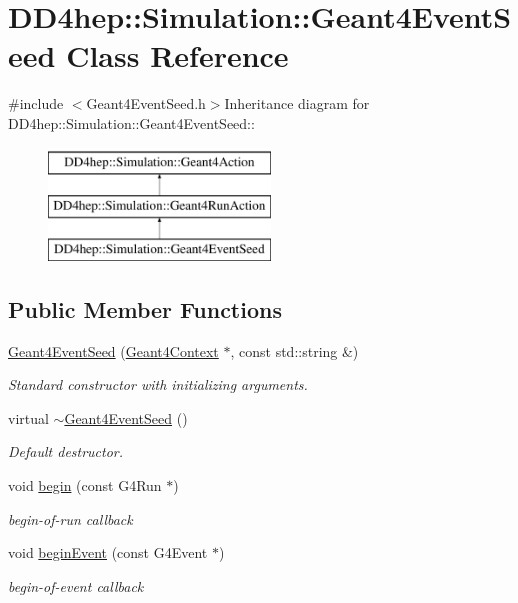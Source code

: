 \hypertarget{class_d_d4hep_1_1_simulation_1_1_geant4_event_seed}{
\section{DD4hep::Simulation::Geant4EventSeed Class Reference}
\label{class_d_d4hep_1_1_simulation_1_1_geant4_event_seed}
}


{\ttfamily \#include $<$Geant4EventSeed.h$>$}Inheritance diagram for DD4hep::Simulation::Geant4EventSeed::\begin{figure}[H]
\begin{center}
\leavevmode
\includegraphics[height=3cm]{class_d_d4hep_1_1_simulation_1_1_geant4_event_seed}
\end{center}
\end{figure}
\subsection*{Public Member Functions}
\begin{DoxyCompactItemize}
\item 
\hyperlink{class_d_d4hep_1_1_simulation_1_1_geant4_event_seed_af30e767cc26c46b017fa8ce36fc8c906}{Geant4EventSeed} (\hyperlink{class_d_d4hep_1_1_simulation_1_1_geant4_context}{Geant4Context} $\ast$, const std::string \&)
\begin{DoxyCompactList}\small\item\em Standard constructor with initializing arguments. \item\end{DoxyCompactList}\item 
virtual \hyperlink{class_d_d4hep_1_1_simulation_1_1_geant4_event_seed_aa5a136f12e95432a45ca2eef0c1b6856}{$\sim$Geant4EventSeed} ()
\begin{DoxyCompactList}\small\item\em Default destructor. \item\end{DoxyCompactList}\item 
void \hyperlink{class_d_d4hep_1_1_simulation_1_1_geant4_event_seed_a297ed6d4c7366df16c151f31bee46028}{begin} (const G4Run $\ast$)
\begin{DoxyCompactList}\small\item\em begin-\/of-\/run callback \item\end{DoxyCompactList}\item 
void \hyperlink{class_d_d4hep_1_1_simulation_1_1_geant4_event_seed_a3443a6ff92629d27474a97c1084d2867}{beginEvent} (const G4Event $\ast$)
\begin{DoxyCompactList}\small\item\em begin-\/of-\/event callback \item\end{DoxyCompactList}\end{DoxyCompactItemize}
